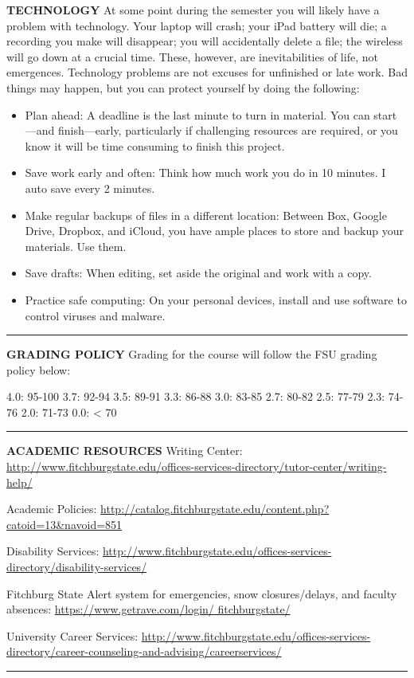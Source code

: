 \documentclass[]{tufte-handout}
\begin{document}
\textbf{TECHNOLOGY} At some point during the semester you will likely
have a problem with technology. Your laptop will crash; your iPad
battery will die; a recording you make will disappear; you will
accidentally delete a file; the wireless will go down at a crucial time.
These, however, are inevitabilities of life, not emergences. Technology
problems are not excuses for unfinished or late work. Bad things may
happen, but you can protect yourself by doing the following:

\begin{itemize}
\item
  Plan ahead: A deadline is the last minute to turn in material. You can
  start---and finish---early, particularly if challenging resources are
  required, or you know it will be time consuming to finish this
  project.
\item
  Save work early and often: Think how much work you do in 10 minutes. I
  auto save every 2 minutes.
\item
  Make regular backups of files in a different location: Between Box,
  Google Drive, Dropbox, and iCloud, you have ample places to store and
  backup your materials. Use them.
\item
  Save drafts: When editing, set aside the original and work with a
  copy.
\item
  Practice safe computing: On your personal devices, install and use
  software to control viruses and malware.
\end{itemize}

\begin{center}\rule{0.5\linewidth}{0.5pt}\end{center}

\textbf{GRADING POLICY} Grading for the course will follow the FSU
grading policy below:

4.0: 95-100 3.7: 92-94 3.5: 89-91 3.3: 86-88 3.0: 83-85 2.7: 80-82 2.5:
77-79 2.3: 74-76 2.0: 71-73 0.0: \textless{} 70

\begin{center}\rule{0.5\linewidth}{0.5pt}\end{center}

\textbf{ACADEMIC RESOURCES} Writing Center:
\url{http://www.fitchburgstate.edu/offices-services-directory/tutor-center/writing-help/}

Academic Policies:
\url{http://catalog.fitchburgstate.edu/content.php?catoid=13\&navoid=851}

Disability Services:
\url{http://www.fitchburgstate.edu/offices-services-directory/disability-services/}

Fitchburg State Alert system for emergencies, snow closures/delays, and
faculty absences:
\href{https://www.getrave.com/login/fitchburgstate/}{https://www.getrave.com/login/
fitchburgstate/}

University Career Services:
\href{http://www.fitchburgstate.edu/offices-services-directory/career-counseling-and-advising/career-services/}{http://www.fitchburgstate.edu/offices-services-directory/career-counseling-and-advising/careerservices/}

\begin{center}\rule{0.5\linewidth}{0.5pt}\end{center}
\end{document}
